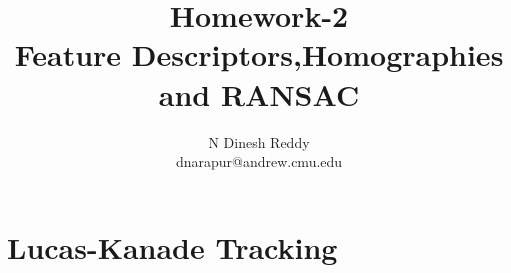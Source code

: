\documentclass[12pt]{article}
\begin{document}
 
 
\title{Homework-2 \\ Feature Descriptors,Homographies and RANSAC}
\author{N Dinesh Reddy \\ dnarapur@andrew.cmu.edu }

\newpage

\maketitle

\section{Lucas-Kanade Tracking}
\end{document}
